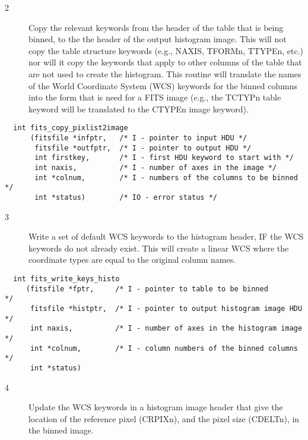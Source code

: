 \documentclass[11pt]{book}
\begin{document}
\begin{description}
\item[2 ] Copy the relevant keywords from the header of the table that is being
binned, to the the header of the output histogram image.  This will not
copy the table structure keywords (e.g., NAXIS, TFORMn, TTYPEn, etc.) nor
will it copy the keywords that apply to other columns of the table that are
not used to create the histogram.  This routine will translate the names of
the World Coordinate System (WCS) keywords for the binned columns into the
form that is need for a FITS image (e.g., the TCTYPn table keyword will
be translated to the CTYPEn image keyword).
 \label{copypixlist2image}
\end{description}

\begin{verbatim}
  int fits_copy_pixlist2image
      (fitsfile *infptr,   /* I - pointer to input HDU */
       fitsfile *outfptr,  /* I - pointer to output HDU */
       int firstkey,       /* I - first HDU keyword to start with */
       int naxis,          /* I - number of axes in the image */
       int *colnum,        /* I - numbers of the columns to be binned  */
       int *status)        /* IO - error status */
\end{verbatim}


\begin{description}
\item[3 ] Write a set of default WCS keywords to the histogram header, IF the
WCS keywords do not already exist.  This will create a linear WCS where
the coordinate types are equal to the original column names.
 \label{writekeyshisto}
\end{description}

\begin{verbatim}
  int fits_write_keys_histo
     (fitsfile *fptr,     /* I - pointer to table to be binned              */
      fitsfile *histptr,  /* I - pointer to output histogram image HDU      */
      int naxis,          /* I - number of axes in the histogram image      */
      int *colnum,        /* I - column numbers of the binned columns       */
      int *status)
\end{verbatim}


\begin{description}
\item[4 ] Update the WCS keywords in a histogram image header that give the location
of the reference pixel (CRPIXn), and the pixel size (CDELTn), in the binned
image.
 \label{rebinwcs}
\end{description}
\end{document}
